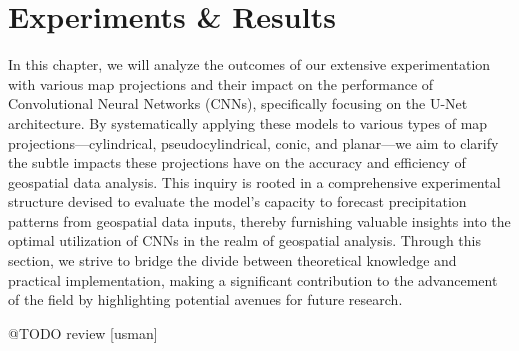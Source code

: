 
\clearpage
\cleardoublepage

\chapter{Experiments \& Results}

\label{chap:experiments_results}

In this chapter, we will analyze the outcomes of our extensive experimentation with various map projections and their impact on the performance
of Convolutional Neural Networks (CNNs), specifically focusing on the U-Net architecture. By systematically applying these models to various types of
map projections—cylindrical, pseudocylindrical, conic, and planar—we aim to clarify the subtle impacts these projections have on the accuracy and efficiency of
geospatial data analysis. This inquiry is rooted in a comprehensive experimental structure devised to evaluate the model's capacity to forecast precipitation patterns
from geospatial data inputs, thereby furnishing valuable insights into the optimal utilization of CNNs in the realm of geospatial analysis. Through this section,
we strive to bridge the divide between theoretical knowledge and practical implementation, making a significant contribution to the advancement of the field by
highlighting potential avenues for future research.

@TODO review [usman]


